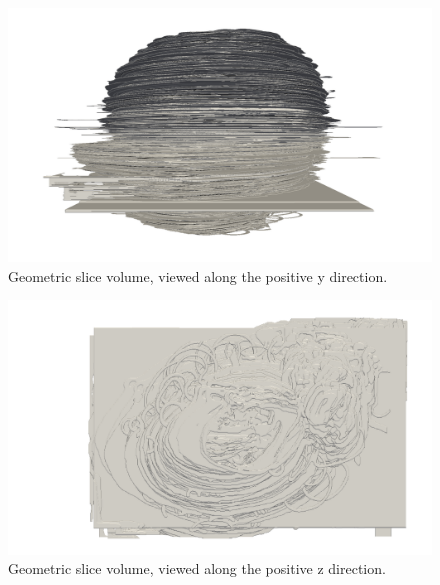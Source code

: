 	\begin{figure}
	  \centering
	  \includegraphics[width=0.9\textheight]{Ch6/Figs/Rat28/contours/whole_positive_y_geometric}
	  \caption{Geometric slice volume, viewed along the positive y direction.}
	  \label{fig:positive_y_geometric_contour}
	\end{figure}

	\begin{figure}
	  \centering
	  \includegraphics[width=0.9\textheight]{Ch6/Figs/Rat28/contours/whole_positive_z_geometric}
	  \caption{Geometric slice volume, viewed along the positive z direction.}
	  \label{fig:positive_z_geometric_contour}
	\end{figure}

